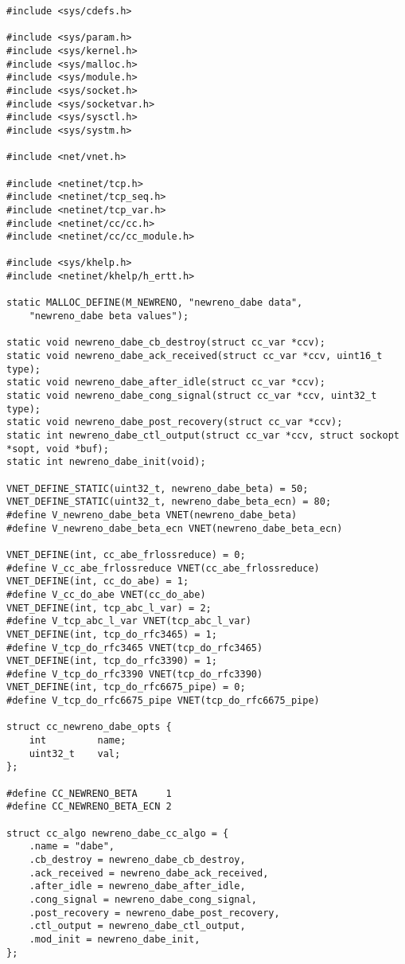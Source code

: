 \begin{code}
\begin{verbatim}
#include <sys/cdefs.h>

#include <sys/param.h>
#include <sys/kernel.h>
#include <sys/malloc.h>
#include <sys/module.h>
#include <sys/socket.h>
#include <sys/socketvar.h>
#include <sys/sysctl.h>
#include <sys/systm.h>

#include <net/vnet.h>

#include <netinet/tcp.h>
#include <netinet/tcp_seq.h>
#include <netinet/tcp_var.h>
#include <netinet/cc/cc.h>
#include <netinet/cc/cc_module.h>

#include <sys/khelp.h>
#include <netinet/khelp/h_ertt.h>

static MALLOC_DEFINE(M_NEWRENO, "newreno_dabe data",
    "newreno_dabe beta values");

static void	newreno_dabe_cb_destroy(struct cc_var *ccv);
static void	newreno_dabe_ack_received(struct cc_var *ccv, uint16_t type);
static void	newreno_dabe_after_idle(struct cc_var *ccv);
static void	newreno_dabe_cong_signal(struct cc_var *ccv, uint32_t type);
static void	newreno_dabe_post_recovery(struct cc_var *ccv);
static int newreno_dabe_ctl_output(struct cc_var *ccv, struct sockopt *sopt, void *buf);
static int newreno_dabe_init(void);

VNET_DEFINE_STATIC(uint32_t, newreno_dabe_beta) = 50;
VNET_DEFINE_STATIC(uint32_t, newreno_dabe_beta_ecn) = 80;
#define V_newreno_dabe_beta VNET(newreno_dabe_beta)
#define V_newreno_dabe_beta_ecn VNET(newreno_dabe_beta_ecn)

VNET_DEFINE(int, cc_abe_frlossreduce) = 0;
#define V_cc_abe_frlossreduce VNET(cc_abe_frlossreduce)
VNET_DEFINE(int, cc_do_abe) = 1;
#define V_cc_do_abe VNET(cc_do_abe)
VNET_DEFINE(int, tcp_abc_l_var) = 2;
#define V_tcp_abc_l_var VNET(tcp_abc_l_var)
VNET_DEFINE(int, tcp_do_rfc3465) = 1;
#define V_tcp_do_rfc3465 VNET(tcp_do_rfc3465)
VNET_DEFINE(int, tcp_do_rfc3390) = 1;
#define V_tcp_do_rfc3390 VNET(tcp_do_rfc3390)
VNET_DEFINE(int, tcp_do_rfc6675_pipe) = 0;
#define V_tcp_do_rfc6675_pipe VNET(tcp_do_rfc6675_pipe)

struct cc_newreno_dabe_opts {
    int			name;
    uint32_t	val;
};

#define CC_NEWRENO_BETA		1
#define CC_NEWRENO_BETA_ECN	2

struct cc_algo newreno_dabe_cc_algo = {
    .name = "dabe",
    .cb_destroy = newreno_dabe_cb_destroy,
    .ack_received = newreno_dabe_ack_received,
    .after_idle = newreno_dabe_after_idle,
    .cong_signal = newreno_dabe_cong_signal,
    .post_recovery = newreno_dabe_post_recovery,
    .ctl_output = newreno_dabe_ctl_output,
    .mod_init = newreno_dabe_init,
};


\end{verbatim}
\end{code}
